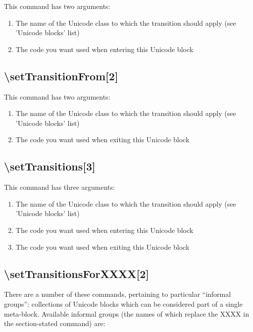 \documentclass{article}
\newenvironment{numberlist}{%
  \begin{enumerate}
	\setlength{\itemsep}{0pt}
	\setlength{\parsep}{0pt}
	\setlength{\topsep}{0pt}
	\setlength{\partopsep}{0pt}
	\setlength{\parskip}{0pt}
	\setlength{\labelsep}{5pt}}%
{
  \end{enumerate}}
\begin{document}
			This command has two arguments:

			\begin{numberlist}
				\item The name of the Unicode class to which the transition should apply (see 'Unicode blocks' list)
				\item The code you want used when entering this Unicode block
			\end{numberlist}

		\subsection{\textbackslash setTransitionFrom[2]}

			This command has two arguments:

			\begin{numberlist}
				\item The name of the Unicode class to which the transition should apply (see 'Unicode blocks' list)
				\item The code you want used when exiting this Unicode block
			\end{numberlist}

		\subsection{\textbackslash setTransitions[3]}

			This command has three arguments:

			\begin{numberlist}
				\item The name of the Unicode class to which the transition should apply (see 'Unicode blocks' list)
				\item The code you want used when entering this Unicode block
				\item The code you want used when exiting this Unicode block
			\end{numberlist}

		\subsection{\textbackslash setTransitionsForXXXX[2]}

			There are a number of these commands, pertaining to particular “informal groups”: collections of Unicode blocks which can be considered part of a single meta-block. Available informal groups (the names of which replace the XXXX in the section-stated command) are:
\end{document}
